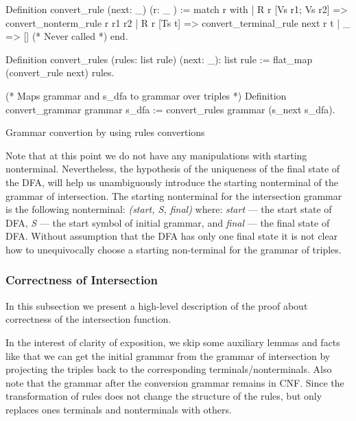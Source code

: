 \begin{listing}[h]
    \begin{pyglist}[language=coq, numbers=none, numbersep=5pt]
  Definition convert_rule (next: _) (r: _ ) :=
    match r with
    | R r [Vs r1; Vs r2] => 
        convert_nonterm_rule r r1 r2
    | R r [Ts t] => 
        convert_terminal_rule next r t 
    | _  => []   (* Never called *)
    end.
        
  Definition convert_rules 
    (rules: list rule) (next: _): list rule :=
    flat_map (convert_rule next) rules.
    
  (* Maps grammar and s_dfa 
     to grammar over triples *)
  Definition convert_grammar grammar s_dfa :=
    convert_rules grammar (s_next s_dfa). 
    \end{pyglist}
    \caption{Grammar convertion by using rules convertions}
    \label{lst:verbments1}
\end{listing}

Note that at this point we do not have any manipulations with starting nonterminal. Nevertheless, the hypothesis of the uniqueness of the final state of the DFA, will help us unambiguously introduce the starting nonterminal of the grammar of intersection. The starting nonterminal for the intersection grammar is the following nonterminal: \textit{(start, S, final)} where: \textit{start} --- the start state of DFA, \textit{S} --- the start symbol of initial grammar, and \textit{final} --- the final state of DFA. Without assumption that the DFA has only one final state it is not clear how to unequivocally choose a starting non-terminal for the grammar of triples.

\subsubsection{Correctness of Intersection}
\label{sec:correctintersection}

In this subsection we present a high-level description of the proof about correctness of the intersection function.

In the interest of clarity of exposition, we skip some auxiliary lemmas and facts like that we can get the initial grammar from the grammar of intersection by projecting the triples back to the corresponding terminals/nonterminals. Also note that the grammar after the conversion grammar remains in CNF. Since the transformation of rules does not change the structure of the rules, but only replaces ones terminals and nonterminals with others.

